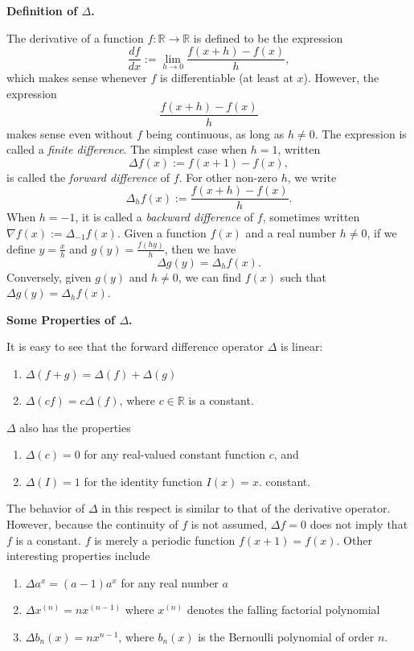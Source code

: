 \documentclass[12pt]{article}
\begin{document}
\textbf{Definition of $\Delta$.}

The derivative of a function $f\colon\mathbb{R}\to\mathbb{R}$ is defined to be the expression
$$\frac{df}{dx}:=\lim_{h\to 0}\frac{f(x+h)-f(x)}{h},$$
which makes sense whenever $f$ is differentiable (at least at $x$).
However, the expression
$$\frac{f(x+h)-f(x)}{h}$$
makes sense even without $f$ being continuous, as long as $h\neq 0$.
The expression is called a \emph{finite difference}.  The simplest
case when $h=1$, written
$$\Delta f(x):=f(x+1)-f(x),$$
is called the \emph{forward difference} of $f$.  For other non-zero
$h$, we write
$$\Delta_h f(x):=\frac{f(x+h)-f(x)}{h}.$$  When $h=-1$, it is called
a \emph{backward difference} of $f$, sometimes written $\nabla
f(x):=\Delta_{-1} f(x)$.  
Given a function $f(x)$ and a real number $h\neq 0$, if we define $y=\frac{x}{h}$ and $g(y)=\frac{f(hy)}{h}$, then we have 
$$\Delta g(y)=\Delta_h f(x).$$  
Conversely, given $g(y)$ and $h\neq 0$, we can find $f(x)$ such that $\Delta g(y)=\Delta_h f(x)$.

\textbf{Some Properties of $\Delta$.}  

It is easy to see that the forward difference operator $\Delta$ is linear:
\begin{enumerate}
\item $\Delta(f+g)=\Delta(f)+\Delta(g)$
\item $\Delta(cf)=c\Delta(f)$, where $c\in\mathbb{R}$ is a
constant.
\end{enumerate}
$\Delta$ also has the properties
\begin{enumerate}
\item $\Delta(c)=0$ for any real-valued constant function $c$, and
\item $\Delta(I)=1$ for the identity function $I(x)=x$.
constant.
\end{enumerate}
The behavior of $\Delta$ in this respect is similar to that of the
derivative operator.  However, because the continuity of $f$ is not assumed, $\Delta f=0$ does not imply that $f$ is a constant.  $f$ is merely a periodic function $f(x+1)=f(x)$.
Other interesting properties include
\begin{enumerate}
\item $\Delta a^x=(a-1)a^x$ for any real number $a$
\item $\Delta x^{(n)}=nx^{(n-1)}$ where $x^{(n)}$ denotes the falling factorial polynomial
\item $\Delta b_n(x)=nx^{n-1}$, where $b_n(x)$ is the Bernoulli polynomial of order $n$.
\end{enumerate}
\end{document}
